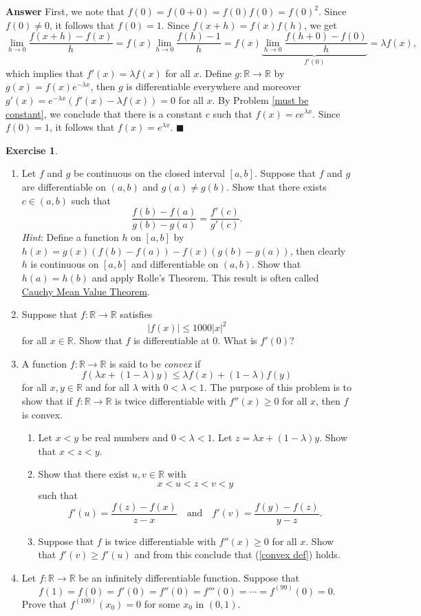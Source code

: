 \documentclass[12pt,letterpaper]{book}
\numberwithin{equation}{section}
\theoremstyle{definition}
\newtheorem{exercise}{\textbf{Exercise}}[chapter]
\newenvironment{answer}{\noindent\textbf{Answer}}{\hfill$\blacksquare$\vspace{0.1in}}
\begin{document}
\begin{answer}
First, we note that $f(0)=f(0+0)=f(0)f(0)=f(0)^2$. Since $f(0)\neq 0$, it follows that $f(0)=1$. Since $f(x+h)=f(x)f(h)$, we get
$$\lim_{h\to 0}\frac{f(x+h)-f(x)}{h}=f(x)\lim_{h\to 0}\frac{f(h)-1}{h}=f(x)\underbrace{\lim_{h\to 0}\frac{f(h+0)-f(0)}{h}}_{f'(0)}=\lambda f(x),$$
which implies that $f'(x)=\lambda f(x)$ for all $x$. Define $g:\mathbb{R}\to \mathbb{R}$ by $g(x)=f(x)e^{-\lambda x}$, then $g$ is differentiable everywhere and moreover $g'(x)=e^{-\lambda x}(f'(x)-\lambda f(x))=0$ for all $x$. By Problem \ref{must be constant}, we conclude that there is a constant $c$ such that $f(x)=ce^{\lambda x}$. Since $f(0)=1$, it follows that $f(x)=e^{\lambda x}$.
\end{answer}

\begin{exercise} \quad
\begin{enumerate}[\bfseries 1.]
\item Let $f$ and $g$ be continuous on the closed interval $[a,b]$. Suppose that $f$ and $g$ are differentiable on $(a,b)$ and $g(a)\neq g(b)$. Show that there exists $c\in (a,b)$ such that $$ \frac{f(b)-f(a)}{g(b)-g(a)}=\frac{f'(c)}{g'(c)}.$$
\textit{Hint}: Define a function $h$ on $[a,b]$ by $h(x)=g(x)(f(b)-f(a))-f(x)(g(b)-g(a))$, then clearly $h$ is continuous on $[a,b]$ and differentiable on $(a,b)$. Show that $h(a)=h(b)$ and apply Rolle's Theorem. This result is often called \underline{Cauchy Mean Value Theorem}.
\item Suppose that $f:\mathbb{R}\to \mathbb{R}$ satisfies $$|f(x)|\leq 1000|x|^2$$ for all $x\in \mathbb{R}$. Show that $f$ is differentiable at $0$. What is $f'(0)$?

\item A function $f:\mathbb{R}\to \mathbb{R}$ is said to be \textit{convex} if
\begin{equation}\label{convex def} f(\lambda x+(1-\lambda) y)\leq \lambda f(x)+(1-\lambda) f(y) \end{equation}
for all $x,y\in \mathbb{R}$ and for all $\lambda$ with $0< \lambda < 1$.
The purpose of this problem is to show that if $f:\mathbb{R}\to \mathbb{R}$ is twice differentiable with $f''(x)\geq 0$ for all $x$, then $f$ is convex.
\begin{enumerate}
\item Let $x<y$ be real numbers and $0<\lambda<1$. Let $z=\lambda x + (1-\lambda) y$. Show that $x<z<y$.
\item Show that there exist $u,v \in \mathbb{R}$ with $$x<u<z<v<y$$ such that
$$f'(u)=\frac{f(z)-f(x)}{z-x}\quad\text{and}\quad f'(v)=\frac{f(y)-f(z)}{y-z}.$$
\item Suppose that $f$ is twice differentiable with $f''(x)\geq 0$ for all $x$. Show that $f'(v)\geq f'(u)$ and from this conclude that (\ref{convex def}) holds.
\end{enumerate}
\item Let $f:\mathbb{R}\to \mathbb{R}$ be an infinitely differentiable function. Suppose that
$$f(1)=f(0)=f'(0)=f''(0)=f'''(0)=\cdots=f^{(99)}(0)=0.$$
Prove that $f^{(100)}(x_0)=0$ for some $x_0$ in $(0,1)$.


\end{enumerate}
\end{exercise}
\end{document}
